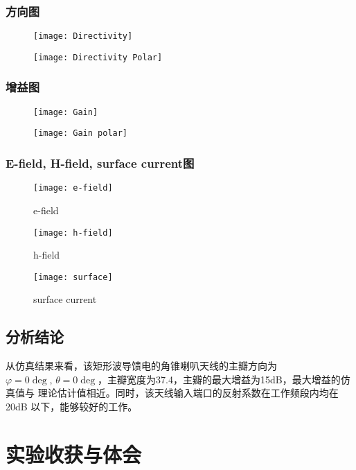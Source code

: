 \documentclass{../source/Experiment}
\begin{document}
            \subsubsection{方向图}
            \begin{figure}[H]
                \centering
                \texttt{[image: Directivity]}
                \caption{}
            \end{figure}
            \begin{figure}[H]
                \centering
                \texttt{[image: Directivity Polar]}
                \caption{}
            \end{figure}
            
            \subsubsection{增益图}
            \begin{figure}[H]
                \centering
                \texttt{[image: Gain]}
                \caption{}
            \end{figure}
            \begin{figure}[H]
                \centering
                \texttt{[image: Gain polar]}
                \caption{}
            \end{figure}
            
            \subsubsection{E-field,  H-field,  surface current图}
            \begin{figure}[H]
                \centering
                \texttt{[image: e-field]}
                \caption{e-field}
            \end{figure}
            \begin{figure}[H]
                \centering
                \texttt{[image: h-field]}
                \caption{h-field}
            \end{figure}
            \begin{figure}[H]
                \centering
                \texttt{[image: surface]}
                \caption{surface current}
            \end{figure}
            
        \subsection{分析结论}

            从仿真结果来看，该矩形波导馈电的角锥喇叭天线的主瓣方向为$ \varphi = 0 \deg ,\, \theta = 0 \deg$，主瓣宽度为37.4\degree ，主瓣的最大增益为15dB，最大增益的仿真值与
            理论估计值相近。同时，该天线输入端口的反射系数在工作频段内均在20dB 以下，能够较好的工作。

    \section{实验收获与体会}

        
    \setcounter{section}{0}
\end{document}
